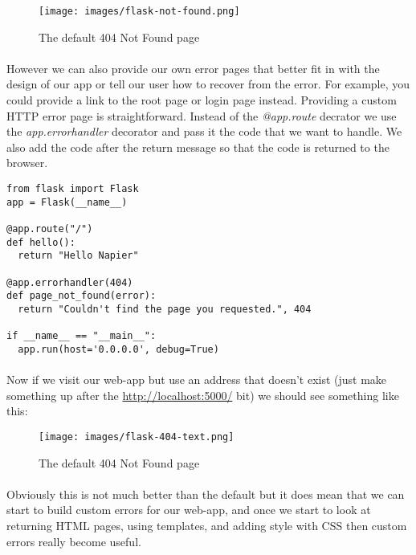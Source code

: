 \documentclass[12pt, a4paper, twoside]{book}
\begin{document}
\begin{figure}[H]
\centering
\texttt{[image: images/flask-not-found.png]}
\caption{The default 404 Not Found page}
\label{fig:flask-not-found}
\end{figure}

\paragraph{} However we can also provide our own error pages that better fit in with the design of our app or tell our user how to recover from the error. For example, you could provide a link to the root page or login page instead. Providing a custom HTTP error page is straightforward. Instead of the \emph{@app.route} decrator we use the \emph{app.errorhandler} decorator and pass it the code that we want to handle. We also add the code after the return message so that the code is returned to the browser.

\begin{lstlisting}
from flask import Flask
app = Flask(__name__)

@app.route("/")
def hello():
  return "Hello Napier"

@app.errorhandler(404)
def page_not_found(error):
  return "Couldn't find the page you requested.", 404

if __name__ == "__main__":
  app.run(host='0.0.0.0', debug=True)
\end{lstlisting}

\paragraph{} Now if we visit our web-app but use an address that doesn't exist (just make something up after the \url{http://localhost:5000/} bit) we should see something like this:

\begin{figure}[H]
\centering
\texttt{[image: images/flask-404-text.png]}
\caption{The default 404 Not Found page}
\label{fig:flask-404-text}
\end{figure}

\paragraph{} Obviously this is not much better than the default but it does mean that we can start to build custom errors for our web-app, and once we start to look at returning HTML pages, using templates, and adding style with CSS then custom errors really become useful.
\end{document}
